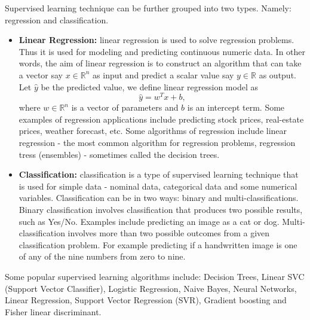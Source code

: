 \documentclass[master]{thesis-uestc}
\begin{document}
Supervised learning technique can be further grouped into two types. Namely: regression and classification.
\begin{itemize}
    \item\textbf{Linear Regression:} linear regression is used to solve regression problems. Thus it is used for modeling and predicting continuous numeric data. In other words, the aim of linear regression is to construct an algorithm that can take a vector say $x \in \mathbb{R}^n$ as input and predict a scalar value say $y \in  \mathbb{R}$ as output. Let $\hat{y}$ be the predicted value, we define linear regression model as
    \begin{equation}
        \hat{y} = w^Tx + b,
    \end{equation}
    where $w \in \mathbb{R}^n$ is a vector of parameters and $b$ is an intercept term. Some examples of regression applications include predicting stock prices, real-estate prices, weather forecast, etc. Some algorithms of regression include linear regression - the most common algorithm for regression problems, regression tress (ensembles) - sometimes called the decision trees.
    \item\textbf{Classification:} classification is a type of supervised learning technique that is used for simple data - nominal data, categorical data and some numerical variables. Classification can be in two ways: binary and multi-classifications. Binary classification involves classification that produces two possible results, such as Yes/No. Examples include predicting an image as a cat or dog. Multi-classification involves more than two possible outcomes from a given classification problem. For example predicting if a handwritten image is one of any of the nine numbers from zero to nine. 
\end{itemize}
Some popular supervised learning algorithms include: Decision Trees, Linear SVC (Support Vector Classifier), Logistic Regression, Naive Bayes, Neural Networks, Linear Regression, Support Vector Regression (SVR), Gradient boosting and Fisher linear discriminant. 
\end{document}
